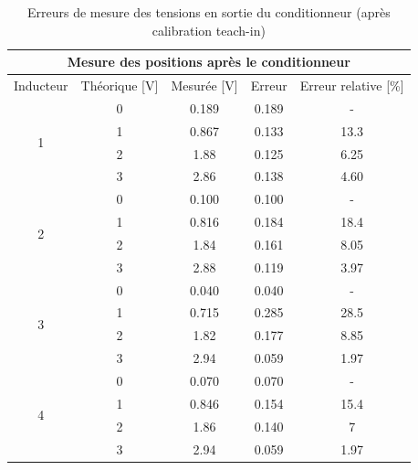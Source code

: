 \begin{table}[H]
    \centering
    \begin{tabular}{|c|c|c|c|c|}
        \hline
        \multicolumn{5}{|c|}{\textbf{Mesure des positions après le conditionneur}}                   \\ \hline
        Inducteur          & Théorique {[}V{]} & Mesurée {[}V{]} & Erreur & Erreur relative {[}\%{]} \\ \hline
        \multirow{4}{*}{1} & 0                 & 0.189           & 0.189  & -                        \\ \cline{2-5}
                           & 1                 & 0.867           & 0.133  & 13.3                     \\ \cline{2-5}
                           & 2                 & 1.88            & 0.125  & 6.25                     \\ \cline{2-5}
                           & 3                 & 2.86            & 0.138  & 4.60                     \\ \hline
        \multirow{4}{*}{2} & 0                 & 0.100           & 0.100  & -                        \\ \cline{2-5}
                           & 1                 & 0.816           & 0.184  & 18.4                     \\ \cline{2-5}
                           & 2                 & 1.84            & 0.161  & 8.05                     \\ \cline{2-5}
                           & 3                 & 2.88            & 0.119  & 3.97                     \\ \hline
        \multirow{4}{*}{3} & 0                 & 0.040           & 0.040  & -                        \\ \cline{2-5}
                           & 1                 & 0.715           & 0.285  & 28.5                     \\ \cline{2-5}
                           & 2                 & 1.82            & 0.177  & 8.85                     \\ \cline{2-5}
                           & 3                 & 2.94            & 0.059  & 1.97                     \\ \hline
        \multirow{4}{*}{4} & 0                 & 0.070           & 0.070  & -                        \\ \cline{2-5}
                           & 1                 & 0.846           & 0.154  & 15.4                     \\ \cline{2-5}
                           & 2                 & 1.86            & 0.140  & 7                        \\ \cline{2-5}
                           & 3                 & 2.94            & 0.059  & 1.97                     \\ \hline
    \end{tabular}
    \caption{Erreurs de mesure des tensions en sortie du conditionneur (après calibration teach-in)}
    \label{tab:teachin_3_cond}
\end{table}

